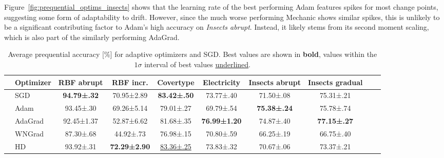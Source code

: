 \documentclass[runningheads]{llncs}
\begin{document}
Figure~\ref{fig:prequential_optims_insects} shows that the learning rate of the best performing Adam features spikes for most change points, suggesting some form of adaptability to drift.
However, since the much worse performing Mechanic shows similar spikes, this is unlikely to be a significant contributing factor to Adam's high accuracy on \textit{Insects abrupt}.
Instead, it likely stems from its second moment scaling, which is also part of the similarly performing AdaGrad.

\begin{table}[ht]
	\centering
	\scriptsize
	\caption{Average prequential accuracy [\%] for adaptive optimizers and SGD. Best values are shown in \textbf{bold}, values within the $1\sigma$ interval of best values \underline{underlined}.}
	\begin{tabular}{llcccccccc}
		\toprule
		                                                   & Optimizer                                                                         & RBF abrupt          & RBF incr.            & Covertype             & Electricity          & Insects abrupt      & Insects gradual     \\
		\midrule
		\multirow{5}{*}{\rotatebox[origin=c]{90}{Tuned}}   & SGD                                                                               & \bfseries 94.79±.32 & 70.95±2.89           & \bfseries 83.42±.50   & 73.77±.40            & 71.50±.08           & 75.31±.21           \\
		                                                   & Adam \cite{kingmaAdamMethodStochastic2017b}                                       & 93.45±.30           & 69.26±5.14           & 79.01±.27             & 69.79±.54            & \bfseries 75.38±.24 & 75.78±.74           \\
		                                                   & AdaGrad \cite{duchiAdaptiveSubgradientMethods2011}                                & 92.45±1.37          & 52.87±6.62           & 81.68±.35             & \bfseries 76.99±1.20 & 74.87±.40           & \bfseries 77.15±.27 \\
		                                                   & WNGrad  \cite{wuWNGradLearnLearning2020}                                          & 87.30±.68           & 44.92±.73            & 76.98±.15             & 70.80±.59            & 66.25±.19           & 66.75±.40           \\
		                                                   & HD \cite{baydinOnlineLearningRate2018}                                            & 93.92±.31           & \bfseries 72.29±2.90 & \underline{83.36±.25} & 73.83±.32            & 70.67±.06           & 73.37±.21           \\ \midrule

\end{tabular}
\end{table}
\end{document}
